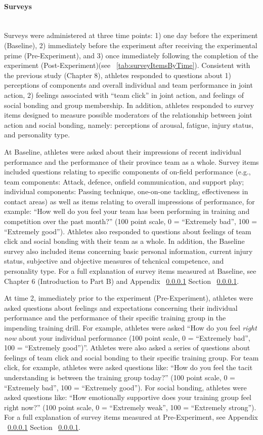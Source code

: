 \documentclass[english]{article}\usepackage[]{graphicx}\usepackage[]{color}
\newcommand{\myparagraph}[1]{\paragraph{#1}\mbox{}\\}
\begin{document}
\myparagraph{Surveys}
Surveys were administered at three time points: 1) one day before the experiment (Baseline), 2) immediately before the experiment after receiving the experimental prime (Pre-Experiment), and 3) once immediately following the completion of the experiment (Post-Experiment)(see ~\ref{tab:surveyItemsByTime}).  Consistent with the previous study (Chapter 8), athletes responded to questions about 1) perceptions of components and overall individual and team performance in joint action, 2) feelings associated with ``team click'' in joint action, and feelings of social bonding and group membership.  In addition, athletes responded to survey items designed to measure possible moderators of the relationship between joint action and social bonding, namely: perceptions of arousal, fatigue, injury status, and personality type.

At Baseline, athletes were asked about their impressions of recent individual performance and the performance of their province team as a whole.  Survey items included questions relating to specific components of on-field performance (e.g., team components: Attack, defence, onfield communication, and support play; individual components: Passing technique, one-on-one tackling, effectiveness in contact areas) as well as items relating to overall impressions of performance, for example: ``How well do you feel your team has been performing in training and competition over the past month?'' (100 point scale, 0 = ``Extremely bad'', 100 = ``Extremely good'').  Athletes also responded to questions about feelings of team click and social bonding with their team as a whole. In addition, the Baseline survey also included items concerning basic personal information, current injury status, subjective and objective measures of tehcnical competence, and personality type.
For a full explanation of survey items measured at Baseline, see Chapter 6 (Introduction to Part B) and Appendix ~\ref{} Section ~\ref{}.

At time 2, immediately prior to the experiment (Pre-Experiment), athletes were asked questions about feelings and expectations concerning their individual performance and the performance of their specific training group in the impending training drill.
For example,  athletes were asked ``How do you feel \textit{right now} about your individual performance (100 point scale, 0 = ``Extremely bad'', 100 = ``Extremely good'')''.  Athletes were also asked a series of questions about feelings of team click and social bonding to their specific training group. For team click, for example, athletes were asked questions like: ``How do you feel the tacit understanding is between the training group today?'' (100 point scale, 0 = ``Extremely bad'', 100 = ``Extremely good'').  For social bonding, athletes were asked questions like: ``How emotionally supportive does your training group feel right now?'' (100 point scale, 0 = ``Extremely weak'', 100 = ``Extremely strong'').
For a full explanation of survey items measured at Pre-Experiment, see Appendix ~\ref{} Section ~\ref{}.
\end{document}
